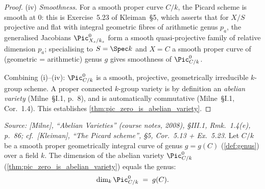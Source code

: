 \begin{proof}
  (iv) \emph{Smoothness.} For a smooth proper curve \(C/k\), the
  Picard scheme is smooth at \(0\): this is Exercise~5.23 of
  Kleiman~\S 5, which asserts that for \(X/S\) projective and flat
  with integral geometric fibres of arithmetic genus \(p_a\), the
  generalised Jacobians \(\Pic^0_{X_s/k_s}\) form a smooth
  quasi-projective family of relative dimension \(p_a\); specialising
  to \(S = \Spec k\) and \(X = C\) a smooth proper curve of (geometric
  = arithmetic) genus \(g\) gives smoothness of \(\Pic^0_{C/k}\).

  Combining (i)--(iv): \(\Pic^0_{C/k}\) is a smooth, projective,
  geometrically irreducible \(k\)-group scheme. A proper connected
  \(k\)-group variety is by definition an \emph{abelian variety}
  (Milne~\S I.1, p.~8), and is automatically commutative (Milne~\S I.1,
  Cor.~1.4). This establishes
  \cref{thm:pic_zero_is_abelian_variety}.
\end{proof}

\begin{theorem}

  \label{thm:pic_zero_dimension_equals_genus}

  \textit{Source: [Milne], ``Abelian Varieties'' (course notes, 2008),
  \S III.1, Rmk.~1.4(e), p.~86; cf.\ [Kleiman], ``The Picard scheme'',
  \S 5, Cor.~5.13 + Ex.~5.23.}
  Let \(C/k\) be a smooth proper geometrically integral curve of genus
  \(g = g(C)\) (\cref{def:genus}) over a field \(k\). The dimension of
  the abelian variety \(\Pic^0_{C/k}\)
  (\cref{thm:pic_zero_is_abelian_variety}) equals the genus:
  \[
    \dim_k \Pic^0_{C/k} \;=\; g(C).
  \]
\end{theorem}

